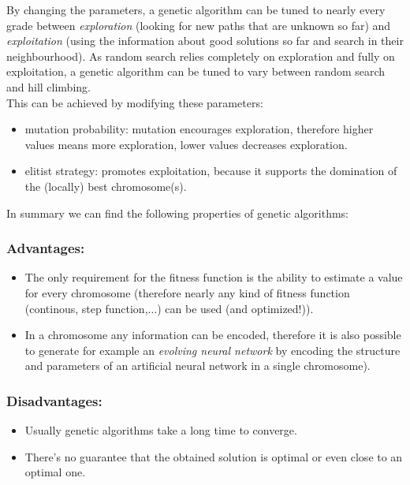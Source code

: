 By changing the parameters, a genetic algorithm can be tuned to nearly every grade between \emph{exploration} (looking for new paths that are unknown so far) and \emph{exploitation} (using the information about good solutions so far and search in their neighbourhood). As random search relies completely on exploration and  fully on exploitation, a genetic algorithm can be tuned to vary between random search and hill climbing.\\
This can be achieved by modifying these parameters:
\begin{itemize}
\item mutation probability: mutation encourages exploration, therefore higher values means more exploration, lower values decreases exploration.
\item elitist strategy: promotes exploitation, because it supports the domination of the (locally) best chromosome(s).
\end{itemize}

In summary we can find the following properties of genetic algorithms:
\renewcommand{\labelitemi}{-}
\subsubsection*{Advantages:}
\begin{itemize}
\item The only requirement for the fitness function is the ability to estimate a value for every chromosome (therefore nearly any kind of fitness function (continous, step function,$\ldots$) can be used (and optimized!)).
\item In a chromosome any information can be encoded, therefore it is also possible to generate for example an \emph{evolving neural network} by encoding the structure and parameters of an artificial neural network in a single chromosome).
\end{itemize}

\subsubsection*{Disadvantages:}
\begin{itemize}
\item Usually genetic algorithms take a long time to converge.
\item There's no guarantee that the obtained solution is optimal or even close to an optimal one.
\end{itemize}
\renewcommand{\labelitemi}{$\bullet$}


